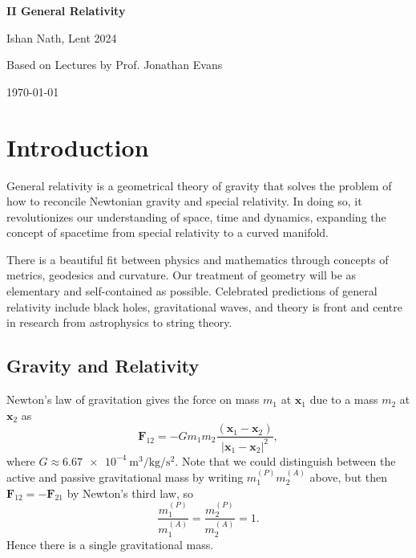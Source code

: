 \documentclass[12pt]{article}
\begin{document}
\hypersetup{pageanchor=false}
\begin{titlepage}
	\begin{center}
		\vspace*{1em}
		\Huge
		\textbf{II General Relativity}

		\vspace{1em}
		\large
		Ishan Nath, Lent 2024

		\vspace{1.5em}

		\Large

		Based on Lectures by Prof. Jonathan Evans

		\vspace{1em}

		\large
		\today
	\end{center}
	
\end{titlepage}
\hypersetup{pageanchor=true}

\tableofcontents

\newpage

\section{Introduction}
\label{sec:intro}

General relativity is a geometrical theory of gravity that solves the problem of how to reconcile Newtonian gravity and special relativity. In doing so, it revolutionizes our understanding of space, time and dynamics, expanding the concept of spacetime from special relativity to a curved manifold.

There is a beautiful fit between physics and mathematics through concepts of metrics, geodesics and curvature. Our treatment of geometry will be as elementary and self-contained as possible. Celebrated predictions of general relativity include black holes, gravitational waves, and theory is front and centre in research from astrophysics to string theory.

\subsection{Gravity and Relativity}
\label{sub:grav_rel}

Newton's law of gravitation gives the force on mass $m_1$ at $\mathbf{x}_1$ due to a mass $m_2$ at $\mathbf{x}_2$ as
\[
\mathbf{F}_{12} = - G m_1 m_2 \frac{(\mathbf{x}_1 - \mathbf{x}_2)}{|\mathbf{x}_1 - \mathbf{x}_2|^2},
\]
where $G \approx \qty{6.67e-4}{\metre\cubed\per\kilogram\per\second\squared}$. Note that we could distinguish between the active and passive gravitational mass by writing $m_1^{(P)}m_2^{(A)}$ above, but then $\mathbf{F}_{12} = - \mathbf{F}_{21}$ by Newton's third law, so
\[
\frac{m_1^{(P)}}{m_1^{(A)}} = \frac{m_2^{(P)}}{m_2^{(A)}} = 1.
\]
Hence there is a single gravitational mass.
\end{document}
